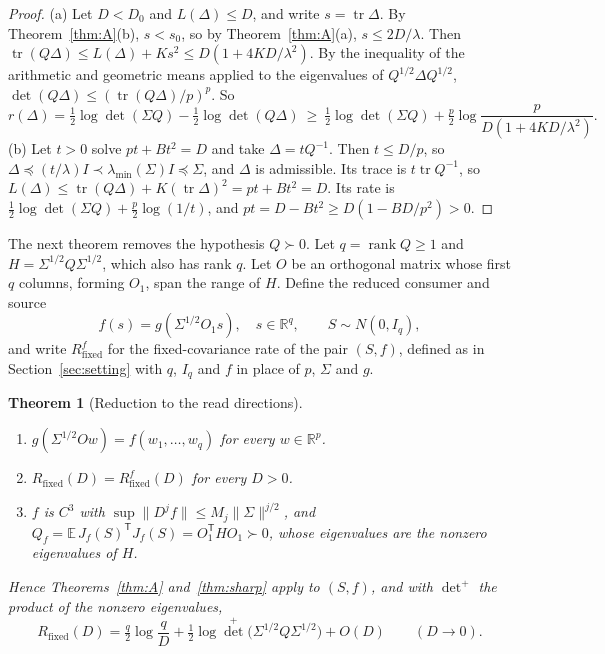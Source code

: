 \documentclass[11pt,onecolumn]{IEEEtran}
\newtheorem{theorem}{Theorem}
\newcommand{\E}{\mathbb{E}}
\newcommand{\R}{\mathbb{R}}
\newcommand{\tr}{\operatorname{tr}}
\newcommand{\lmin}{\lambda_{\min}}
\newcommand{\Rfix}{R_{\mathrm{fixed}}}
\begin{document}
\begin{proof}
(a) Let $D<D_0$ and $L(\Delta)\le D$, and write $s=\tr\Delta$. By
Theorem~\ref{thm:A}(b), $s<s_0$, so by Theorem~\ref{thm:A}(a), $s\le2D/\lambda$. Then
$\tr(Q\Delta)\le L(\Delta)+Ks^2\le D(1+4KD/\lambda^2)$. By the inequality of the
arithmetic and geometric means applied to the eigenvalues of
$Q^{1/2}\Delta Q^{1/2}$, $\det(Q\Delta)\le(\tr(Q\Delta)/p)^p$. So
\[
r(\Delta)=\tfrac12\log\det(\Sigma Q)-\tfrac12\log\det(Q\Delta)
\ \ge\ \tfrac12\log\det(\Sigma Q)+\tfrac p2\log\frac{p}{D(1+4KD/\lambda^2)} .
\]
(b) Let $t>0$ solve $pt+Bt^2=D$ and take $\Delta=tQ^{-1}$. Then $t\le D/p$, so
$\Delta\preceq(t/\lambda)I\prec\lmin(\Sigma)I\preceq\Sigma$, and $\Delta$ is admissible.
Its trace is $t\tr Q^{-1}$, so
$L(\Delta)\le\tr(Q\Delta)+K(\tr\Delta)^2=pt+Bt^2=D$. Its rate is
$\tfrac12\log\det(\Sigma Q)+\tfrac p2\log(1/t)$, and
$pt=D-Bt^2\ge D(1-BD/p^2)>0$.
\end{proof}

The next theorem removes the hypothesis $Q\succ0$. Let $q=\operatorname{rank}Q\ge1$ and
$H=\Sigma^{1/2}Q\Sigma^{1/2}$, which also has rank $q$. Let $O$ be an orthogonal matrix
whose first $q$ columns, forming $O_1$, span the range of $H$. Define the reduced
consumer and source
\[
f(s)=g(\Sigma^{1/2}O_1s),\quad s\in\R^q,\qquad S\sim N(0,I_q),
\]
and write $\Rfix^{f}$ for the fixed-covariance rate of the pair $(S,f)$, defined as in
Section~\ref{sec:setting} with $q$, $I_q$ and $f$ in place of $p$, $\Sigma$ and $g$.

\begin{theorem}[Reduction to the read directions]\label{thm:reduce}
\begin{enumerate}
\item[(a)] $g(\Sigma^{1/2}Ow)=f(w_1,\dots,w_q)$ for every $w\in\R^p$.
\item[(b)] $\Rfix(D)=\Rfix^{f}(D)$ for every $D>0$.
\item[(c)] $f$ is $C^3$ with $\sup\|D^jf\|\le M_j\|\Sigma\|^{j/2}$, and
$Q_f=\E\,J_f(S)^{\mathsf T}J_f(S)=O_1^{\mathsf T}HO_1\succ0$, whose eigenvalues are the
nonzero eigenvalues of $H$.
\end{enumerate}
Hence Theorems~\ref{thm:A} and~\ref{thm:sharp} apply to $(S,f)$, and with $\det^{+}$ the
product of the nonzero eigenvalues,
\[
\Rfix(D)=\tfrac q2\log\frac qD+\tfrac12\log{\det}^{+}\bigl(\Sigma^{1/2}Q\Sigma^{1/2}\bigr)
+O(D)\qquad(D\to0).
\]
\end{theorem}
\end{document}
